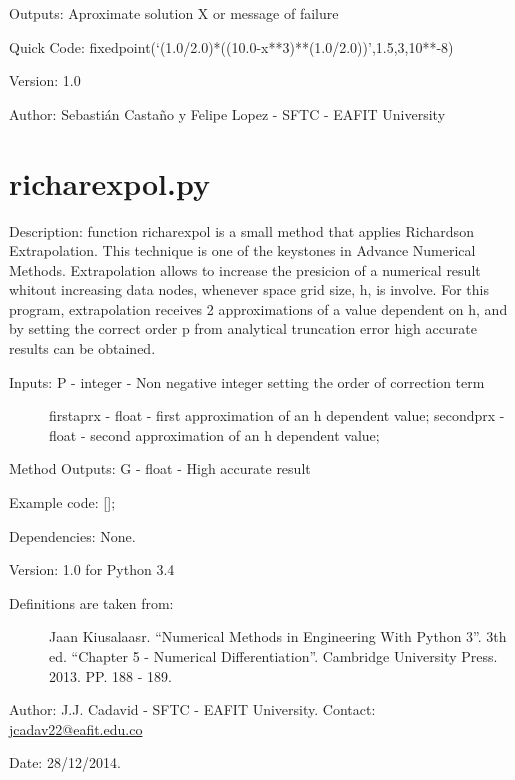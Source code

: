 \documentclass[letterpaper,10pt,oneside]{sphinxmanual}
\theoremstyle{plain}%
\theoremstyle{definition}%
\theoremstyle{remark}%
\begin{document}
Outputs: Aproximate solution X or message of failure

Quick Code: fixedpoint(`(1.0/2.0)*((10.0-x**3)**(1.0/2.0))',1.5,3,10**-8)

Version: 1.0

Author: Sebastián Castaño y Felipe Lopez - SFTC - EAFIT University


\section{richarexpol.py}
\label{code:module-richarexpol}\label{code:richarexpol-py}
Description: function richarexpol is a small method that applies Richardson
Extrapolation. This technique is one of the keystones in Advance Numerical
Methods. Extrapolation allows to increase the presicion of a numerical 
result whitout increasing data nodes, whenever space grid size, h, is involve.
For this program, extrapolation receives 2 approximations of a value dependent
on h, and by setting the correct order p from analytical truncation error
high accurate results can be obtained.
\begin{description}
\item[{Inputs: P - integer - Non negative integer setting the order of correction term}] \leavevmode
firstaprx - float - first approximation of an h dependent value;
secondprx - float - second approximation of an h dependent value;

\end{description}

Method Outputs: G - float - High accurate result

Example code: {[}{]};

Dependencies: None.

Version: 1.0 for Python 3.4
\begin{description}
\item[{Definitions are taken from:}] \leavevmode
Jaan Kiusalaasr. ``Numerical Methods in Engineering With Python 3''.
3th ed. ``Chapter 5 - Numerical Differentiation''. 
Cambridge University Press. 2013. PP. 188 - 189.

\end{description}

Author: J.J. Cadavid - SFTC - EAFIT University.
Contact: \href{mailto:jcadav22@eafit.edu.co}{jcadav22@eafit.edu.co}

Date: 28/12/2014.
\end{document}
